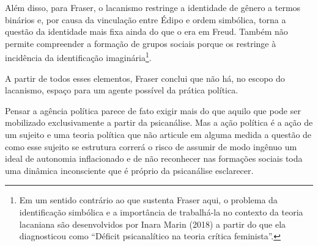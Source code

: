 Além disso, para Fraser, o lacanismo restringe a identidade de gênero a
termos binários e, por causa da vinculação entre Édipo e ordem
simbólica, torna a questão da identidade mais fixa ainda do que o era em
Freud. Também não permite compreender a formação de grupos sociais
porque os restringe à incidência da identificação imaginária\footnote{Em
  um sentido contrário ao que sustenta Fraser aqui, o problema da
  identificação simbólica e a importância de trabalhá-la no contexto da
  teoria lacaniana são desenvolvidos por Inara Marin (2018) a partir do
  que ela diagnosticou como ``Déficit psicanalítico na teoria crítica
  feminista''.}.

A partir de todos esses elementos, Fraser conclui que não há, no escopo
do lacanismo, espaço para um agente possível da prática política.

Pensar a agência política parece de fato exigir mais do que aquilo que
pode ser mobilizado exclusivamente a partir da psicanálise. Mas a ação
política é a ação de um sujeito e uma teoria política que não articule
em alguma medida a questão de como esse sujeito se estrutura correrá o
risco de assumir de modo ingênuo um ideal de autonomia inflacionado e de
não reconhecer nas formações sociais toda uma dinâmica inconsciente que
é próprio da psicanálise esclarecer.

